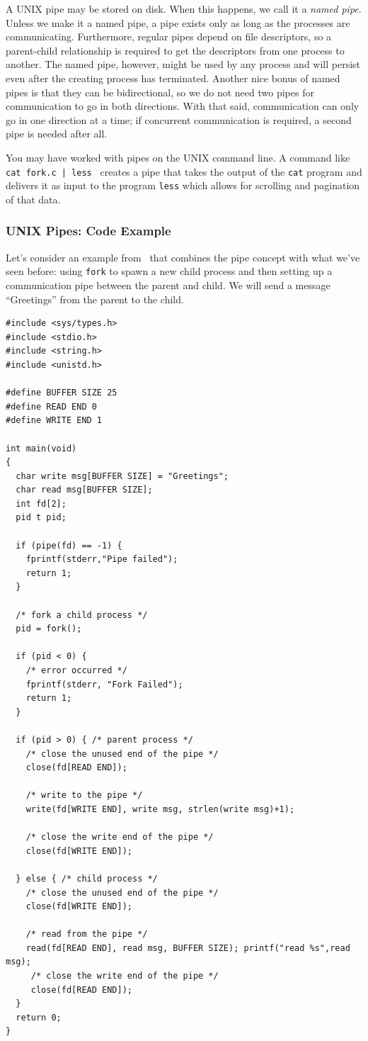 A UNIX pipe may be stored on disk. When this happens, we call it a \textit{named pipe}. Unless we make it a named pipe, a pipe exists only as long as the processes are communicating. Furthermore, regular pipes depend on file descriptors, so a parent-child relationship is required to get the descriptors from one process to another. The named pipe, however, might be used by any process and will persist even after the creating process has terminated. Another nice bonus of named pipes is that they can be bidirectional, so we do not need two pipes for communication to go in both directions. With that said, communication can only go in one direction at a time; if concurrent communication is required, a second pipe is needed after all.

You may have worked with pipes on the UNIX command line. A command like \texttt{ cat fork.c | less } creates a pipe that takes the output of the \texttt{cat} program and delivers it as input to the program \texttt{less} which allows for scrolling and pagination of that data.

\subsubsection*{UNIX Pipes: Code Example}

Let's consider an example from~\cite{osc} that combines the pipe concept with what we've seen before: using \texttt{fork} to spawn a new child process and then setting up a communication pipe between the parent and child. We will send a message ``Greetings'' from the parent to the child.

\begin{verbatim}
#include <sys/types.h> 
#include <stdio.h> 
#include <string.h> 
#include <unistd.h>

#define BUFFER SIZE 25
#define READ END 0 
#define WRITE END 1

int main(void)
{
  char write msg[BUFFER SIZE] = "Greetings"; 
  char read msg[BUFFER SIZE];
  int fd[2];
  pid t pid;

  if (pipe(fd) == -1) {
    fprintf(stderr,"Pipe failed");
    return 1;
  }
  
  /* fork a child process */
  pid = fork();
  
  if (pid < 0) { 
    /* error occurred */ 
    fprintf(stderr, "Fork Failed"); 
    return 1;
  }

  if (pid > 0) { /* parent process */
    /* close the unused end of the pipe */ 
    close(fd[READ END]);
    
    /* write to the pipe */
    write(fd[WRITE END], write msg, strlen(write msg)+1);
    
    /* close the write end of the pipe */
    close(fd[WRITE END]);
    
  } else { /* child process */
    /* close the unused end of the pipe */ 
    close(fd[WRITE END]);
    
    /* read from the pipe */
    read(fd[READ END], read msg, BUFFER SIZE); printf("read %s",read msg);
     /* close the write end of the pipe */
     close(fd[READ END]);
  }
  return 0;
}
\end{verbatim}

